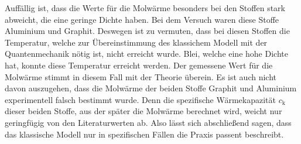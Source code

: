 Auffällig ist, dass die Werte für die Molwärme besonders bei den Stoffen stark abweicht, die eine geringe Dichte haben.
Bei dem Versuch waren diese Stoffe Aluminium und Graphit.
Deswegen ist zu vermuten, dass bei diesen Stoffen die Temperatur, welche zur Übereinstimmung des klassichem Modell mit der Quantenmechanik nötig ist, nicht erreicht wurde.
Blei, welche eine hohe Dichte hat, konnte diese Temperatur erreicht werden. 
Der gemessene Wert für die Molwärme stimmt in diesem Fall mit der Theorie überein.
Es ist auch nicht davon auszugehen, dass die Molwärme der beiden Stoffe Graphit und Aluminium experimentell falsch bestimmt wurde.
Denn die spezifische Wärmekapazität $c_\text{k}$ dieser beiden Stoffe, aus der später die Molwärme berechnet wird, weicht nur geringfügig von den Literaturwerten ab.
Also lässt sich abschließend sagen, dass das klassische Modell nur in spezifischen Fällen die Praxis passent beschreibt.
